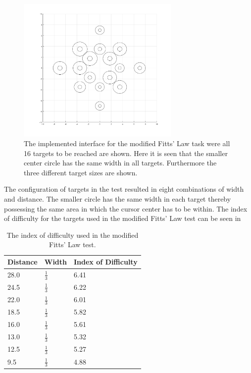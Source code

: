 \begin{figure}[H] 
	\includegraphics[width=0.7\textwidth]{figures/pMethods/DotsToReach}
	\caption{The implemented interface for the modified Fitts' Law task were all 16 targets to be reached are shown. Here it is seen that the smaller center circle has the same width in all targets. Furthermore the three different target sizes are shown.}
	\label{fig:alltargets}
\end{figure}


The configuration of targets in the test resulted in eight combinations of width and distance. The smaller circle has the same width in each target thereby possessing the same area in which the cursor center has to be within. The index of difficulty for the targets used in the modified Fitts' Law test can be seen in 

\begin{table}[H]
	\centering
	\caption{The index of difficulty used in the modified Fitts' Law test.}
	\label{tab:M:ID}
	\begin{tabular}{l|l|l}
		
		Distance & Width         & Index of Difficulty \\ \hline
		28.0     & $\frac{1}{3}$ & 6.41                \\ \hline
		24.5     & $\frac{1}{3}$ & 6.22                \\ \hline
		22.0     & $\frac{1}{3}$ & 6.01                \\ \hline
		18.5     & $\frac{1}{3}$ & 5.82                \\ \hline
		16.0     & $\frac{1}{3}$ & 5.61                \\ \hline
		13.0     & $\frac{1}{3}$ & 5.32                \\ \hline
		12.5     & $\frac{1}{3}$ & 5.27                \\ \hline
		9.5      & $\frac{1}{3}$ & 4.88                \\ \hline
	\end{tabular}
\end{table}



